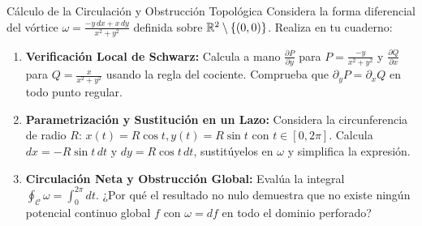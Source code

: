 \documentclass[10pt,aspectratio=169]{beamer}
\begin{document}
\begin{frame}{Cálculo de la Circulación y Obstrucción Topológica}
  \vspace{0.05cm}
  Considera la forma diferencial del vórtice $\omega = \frac{-y\,dx + x\,dy}{x^2+y^2}$ definida sobre $\mathbb{R}^2 \setminus \{(0,0)\}$. Realiza en tu cuaderno:
  \vspace{0.22cm}
  \begin{enumerate}\itemsep10pt
    \item[(a)] \textbf{Verificación Local de Schwarz:} Calcula a mano $\frac{\partial P}{\partial y}$ para $P = \frac{-y}{x^2+y^2}$ y $\frac{\partial Q}{\partial x}$ para $Q = \frac{x}{x^2+y^2}$ usando la regla del cociente. Comprueba que $\partial_y P = \partial_x Q$ en todo punto regular.
    \item[(b)] \textbf{Parametrización y Sustitución en un Lazo:} Considera la circunferencia de radio $R$: $x(t) = R\cos t, y(t) = R\sin t$ con $t \in [0, 2\pi]$. Calcula $dx = -R\sin t\,dt$ y $dy = R\cos t\,dt$, sustitúyelos en $\omega$ y simplifica la expresión.
    \item[(c)] \textbf{Circulación Neta y Obstrucción Global:} Evalúa la integral $\oint_\mathcal{C} \omega = \int_0^{2\pi} dt$. ¿Por qué el resultado no nulo demuestra que no existe ningún potencial continuo global $f$ con $\omega = df$ en todo el dominio perforado?
  \end{enumerate}
\end{frame}
\end{document}

